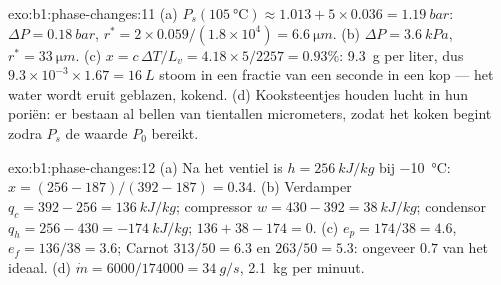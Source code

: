 \begin{solution}{exo:b1:phase-changes:11}
(a) $P_s(\qty{105}{\degreeCelsius}) \approx 1.013 + 5 \times 0.036 = \qty{1.19}{bar}$:
$\Delta P = \qty{0.18}{bar}$, $r^\ast = 2 \times 0.059/(1.8 \times 10^4) = \qty{6.6}{\micro m}$.
(b) $\Delta P = \qty{3.6}{kPa}$, $r^\ast = \qty{33}{\micro m}$. (c) $x = c\,\Delta T/L_v =
4.18 \times 5/2257 = 0.93\%$: \qty{9.3}{g} per liter, dus $9.3 \times 10^{-3}
\times 1.67 = \qty{16}{L}$ stoom in een fractie van een seconde in
een kop --- het water wordt eruit geblazen, kokend. (d) Kooksteentjes houden lucht in hun
poriën: er bestaan al bellen van tientallen micrometers, zodat het koken begint
zodra $P_s$ de waarde $P_0$ bereikt.
\end{solution}

\begin{solution}{exo:b1:phase-changes:12}
(a) Na het ventiel is $h = \qty{256}{kJ/kg}$ bij \qty{-10}{\degreeCelsius}: $x =
(256 - 187)/(392 - 187) = 0.34$. (b) Verdamper $q_c = 392 - 256 =
\qty{136}{kJ/kg}$; compressor $w = 430 - 392 = \qty{38}{kJ/kg}$; condensor
$q_h = 256 - 430 = \qty{-174}{kJ/kg}$; $136 + 38 - 174 = 0$. (c) $e_p =
174/38 = 4.6$, $e_f = 136/38 = 3.6$; Carnot $313/50 = 6.3$ en $263/50 =
5.3$: ongeveer $0.7$ van het ideaal. (d) $\dot m = 6000/174000 = \qty{34}{g/s}$,
\qty{2.1}{kg} per minuut.
\end{solution}

